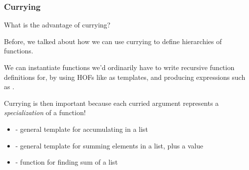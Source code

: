 \documentclass[aspectratio=169, handout]{beamer}
\begin{document}
\begin{frame}[fragile]
  \frametitle{Currying}

  What is the advantage of currying?

  \pause
  \vspace{\fill}

  Before, we talked about how we can use currying to define hierarchies of functions.

  \pause
  \vspace{\fill}

  We can instantiate functions we'd ordinarily have to write recursive function definitions
  for, by using HOFs like  as templates, and producing expressions such as
  .

  \pause
  \vspace{\fill}

  Currying is then important because each curried argument represents a \textit{specialization}
  of a function!

  \pause
  \vspace{\fill}

  \begin{itemize}
    \item {} - general template for accumulating in a list \pause
    \item {} - general template for summing elements in a list, plus a value \pause
    \item {} - function for finding sum of a list
  \end{itemize}
\end{frame}
\end{document}
